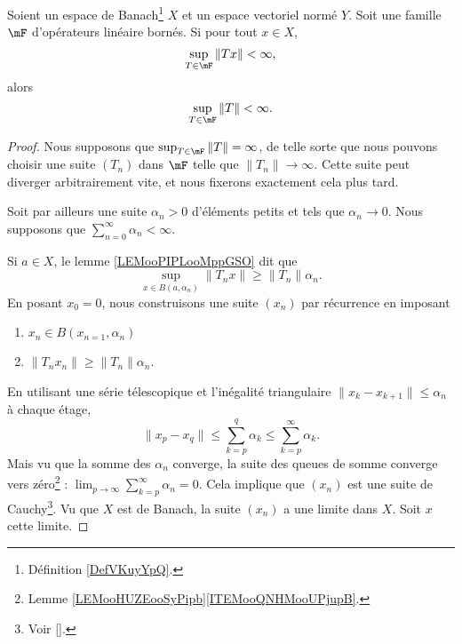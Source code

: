 \begin{theorem}       \label{THOooJHVNooIDDxyT}
    Soient un espace de Banach\footnote{Définition \ref{DefVKuyYpQ}.} \( X\) et un espace vectoriel normé \( Y\). Soit une famille \( \mF\) d'opérateurs linéaire bornés. Si pour tout \( x\in  X\),
    \begin{equation}
        \sup_{T\in\mF}\| Tx \|<\infty,
    \end{equation}
    alors 
    \begin{equation}
        \sup_{T\in \mF}\| T \|<\infty.
    \end{equation}
\end{theorem}

\begin{proof}
    Nous supposons que \( \sup_{T\in\mF}\| T \|=\infty\), de telle sorte que nous pouvons choisir une suite \( (T_n)\) dans \( \mF\) telle que \( \| T_n \|\to \infty\). Cette suite peut diverger arbitrairement vite, et nous fixerons exactement cela plus tard.

    Soit par ailleurs une suite \( \alpha_n>0\) d'éléments petits et tels que \( \alpha_n\to 0\). Nous supposons que \( \sum_{n=0}^{\infty}\alpha_n<\infty\).

    Si \( a\in X\), le lemme \ref{LEMooPIPLooMppGSO} dit que
    \begin{equation}
        \sup_{x\in B(a,\alpha_n)}\| T_nx \|\geq \| T_n \|\alpha_n.
    \end{equation}
    En posant \( x_0=0\), nous construisons une suite \( (x_n)\) par récurrence en imposant
    \begin{enumerate}
        \item
            \( x_n\in B(x_{n=1}, \alpha_n)\)
        \item
            \( \| T_nx_n \|\geq \| T_n \|\alpha_n\).
    \end{enumerate}
    En utilisant une série télescopique et l'inégalité triangulaire \( \| x_k-x_{k+1} \|\leq \alpha_n\) à chaque étage,
    \begin{equation}
        \| x_p-x_q \|\leq \sum_{k=p}^q\alpha_k\leq \sum_{k=p}^{\infty}\alpha_k.
    \end{equation}
    Mais vu que la somme des \( \alpha_n\) converge, la suite des queues de somme converge vers zéro\footnote{Lemme \ref{LEMooHUZEooSyPipb}\ref{ITEMooQNHMooUPjupB}.} : \( \lim_{p\to \infty}\sum_{k=p}^{\infty}\alpha_n=0\). Cela implique que \( (x_n)\) est une suite de Cauchy\footnote{Voir \ref{}.}. Vu que \( X\) est de Banach, la suite \( (x_n)\) a une limite dans \( X\). Soit \( x\) cette limite.


\end{proof}
